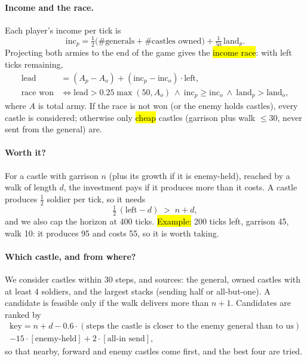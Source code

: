 \paragraph{Income and the race.} Each player's income per tick is
\begin{equation}
\text{inc}_p=\tfrac12\big(\#\text{generals}+\#\text{castles owned}\big)+\tfrac{1}{50}\,\text{land}_p.
\end{equation}
Projecting both armies to the end of the game gives the \hl{income race}: with left ticks remaining,
\begin{align}
\text{lead}&=(A_p-A_o)+(\text{inc}_p-\text{inc}_o)\cdot\text{left},\\
\text{race won}&\iff\text{lead}>0.25\max(50,A_o)\ \wedge\ \text{inc}_p\ge\text{inc}_o\ \wedge\ \text{land}_p>\text{land}_o,
\end{align}
where $A$ is total army. If the race is not won (or the enemy holds castles), every castle is considered;
otherwise only \hl{cheap} castles (garrison plus walk $\le 30$, never sent from the general) are.

\paragraph{Worth it?} For a castle with garrison $n$ (plus its growth if it is enemy-held), reached by a walk of
length $d$, the investment pays if it produces more than it costs. A castle produces $\tfrac12$ soldier per
tick, so it needs
\begin{equation}
\tfrac12\,(\text{left}-d)\;>\;n+d,
\end{equation}
and we also cap the horizon at 400 ticks. \hl{Example:} 200 ticks left, garrison 45, walk 10: it produces 95 and
costs 55, so it is worth taking.

\paragraph{Which castle, and from where?} We consider castles within 30 steps, and sources: the general, owned
castles with at least 4 soldiers, and the largest stacks (sending half or all-but-one). A candidate is feasible
only if the walk delivers more than $n+1$. Candidates are ranked by
\begin{multline}
\text{key}=n+d-0.6\cdot(\text{steps the castle is closer to the enemy general than to us})\\
-15\cdot[\text{enemy-held}]+2\cdot[\text{all-in send}],
\end{multline}
so that nearby, forward and enemy castles come first, and the best four are tried.


